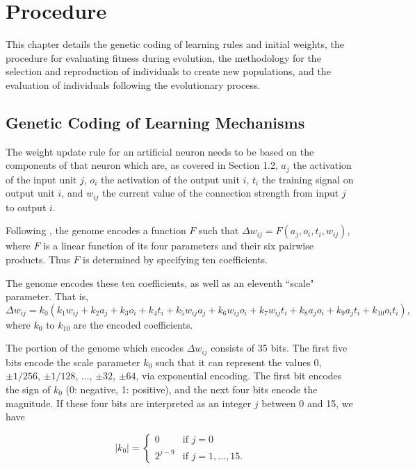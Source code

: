\documentclass[master]{outhesis}
\begin{document}
\chapter{Procedure}

This chapter details the genetic coding of learning rules and initial weights,
the procedure for evaluating fitness during evolution,
the methodology for the selection and reproduction of individuals to create new populations,
and the evaluation of individuals following the evolutionary process.

\section{Genetic Coding of Learning Mechanisms}

The weight update rule for an artificial neuron needs to be based on the components of that neuron which are, as covered in Section 1.2, $a_j$ the activation of the input unit $j$, $o_i$ the activation of the output unit $i$, $t_i$ the training signal on output unit $i$, and $w_{ij}$ the current value of the connection strength from input $j$ to output $i$.

Following \cite{Chalmers:1990aa}, the genome encodes a function $F$ such that $\Delta w_{ij} = F(a_j, o_i, t_i, w_{ij})$, where $F$ is a linear function of its four parameters and their six pairwise products. Thus $F$ is determined by specifying ten coefficients.

The genome encodes these ten coefficients, as well as an eleventh ``scale" parameter. That is,
\[
	\Delta w_{ij} = k_0(k_1w_{ij}+k_2a_j+k_3o_i+k_4t_i+k_5w_{ij}a_j+k_6w_{ij}o_i+k_7w_{ij}t_{i}+k_8a_jo_i+k_9a_jt_i+k_{10}o_it_i),
\]
where $k_0$ to $k_{10}$ are the encoded coefficients.

The portion of the genome which encodes $\Delta w_{ij}$ consists of 35 bits. The first five bits encode the scale parameter $k_0$ such that it can represent the values $0$, $\pm 1/256$, $\pm 1/128$, ..., $\pm 32$, $\pm 64$, via exponential encoding. The first bit encodes the sign of $k_0$ (0: negative, 1: positive), and the next four bits encode the magnitude. If these four bits are interpreted as an integer $j$ between 0 and 15, we have

\[
	|k_0|=
	\begin{cases}
		0 & \text{if $j = 0$}\\
		2^{j-9} & \text{if $j = 1, ..., 15$.}
	\end{cases}
\]
\end{document}
